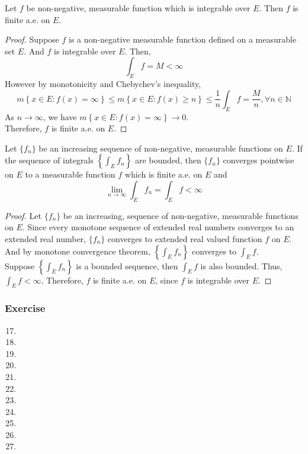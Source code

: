 \begin{theorem}
	Let $f$ be non-negative, measurable function which is integrable over $E$.
	Then $f$ is finite a.e. on $E$.
\end{theorem}
\begin{proof}
	Suppose $f$ is a non-negative measurable function defined on a measurable set $E$.
	And $f$ is integrable over $E$.
	Then,
	\[ \int_E f = M < \infty \]
	However by monotonicity and Chebychev's inequality,
	\[ m\left\{ x \in E : f(x) = \infty \right\} \le m\left\{ x \in E : f(x) \ge n \right\} \le \frac{1}{n} \int_E f = \frac{M}{n}, \forall n \in \mathbb{N} \]
	As $n \to \infty$, we have $m\left\{ x \in E : f(x) = \infty \right\} \to 0$.\\
	Therefore, $f$ is finite a.e. on $E$.
\end{proof}

\begin{theorem}
	Let $\{ f_n \}$ be an increasing sequence of non-negative, measurable functions on $E$.
	If the sequence of integrals $\displaystyle \left\{ \int_E f_n \right\}$ are bounded, then $\{ f_n \}$ converges pointwise on $E$ to a measurable function $f$ which is finite a.e. on $E$ and 
	\[ \lim_{n \to \infty} \int_E f_n = \int_E f < \infty \]
\end{theorem}
\begin{proof}
	Let $\{ f_n \}$ be an increasing, sequence of non-negative, measurable functions on $E$.
	Since every monotone sequence of extended real numbers converges to an extended real number, $\{ f_n \}$ converges to extended real valued function $f$ on $E$.
	And by monotone convergence theorem, $\left\{ \int_E f_n \right\}$ converges to $\displaystyle \int_E f$.\\

	Suppose $\displaystyle\left\{ \int_E f_n \right\}$ is a bounded sequence, then $\displaystyle \int_E f$ is also bounded.
	Thus, $\displaystyle \int_E f < \infty$.
	Therefore, $f$ is finite a.e. on $E$, since $f$ is integrable over $E$.
\end{proof}
\subsubsection{Exercise}
\begin{enumerate}
	\setcounter{enumi}{16}
	\item
	\item
	\item
	\item
	\item
	\item
	\item
	\item
	\item
	\item
	\item
\end{enumerate}
